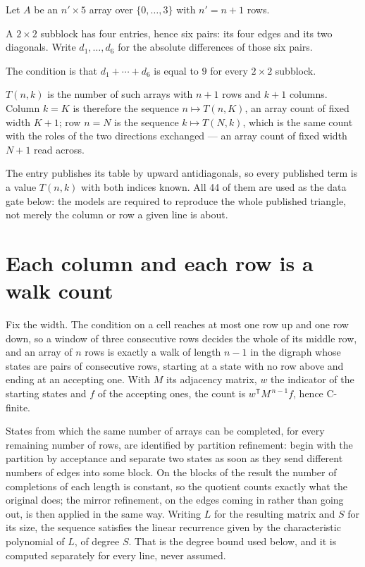\documentclass[11pt]{article}
\theoremstyle{definition}
\begin{document}
Let $A$ be an $n' \times 5$ array over $\{0,\dots,3\}$ with $n' = n + 1$ rows.

A $2\times2$ subblock has four entries, hence six pairs: its four edges and its two diagonals. Write $d_1,\dots,d_6$ for the absolute differences of those six pairs.

The condition is that $d_1+\cdots+d_6$ is equal to $9$ for every $2\times2$ subblock.

$T(n,k)$ is the number of such arrays with $n + 1$ rows and $k + 1$ columns. Column $k = K$ is therefore the sequence $n \mapsto T(n,K)$, an array count of fixed width $K + 1$; row $n = N$ is the sequence $k \mapsto T(N,k)$, which is the same count with the roles of the two directions exchanged --- an array count of fixed width $N + 1$ read across.

The entry publishes its table by upward antidiagonals, so every published term is a value $T(n,k)$ with both indices known. All 44 of them are used as the data gate below: the models are required to reproduce the whole published triangle, not merely the column or row a given line is about.

\section{Each column and each row is a walk count}

Fix the width. The condition on a cell reaches at most one row up and one row down, so a window of three consecutive rows decides the whole of its middle row, and an array of $n$ rows is exactly a walk of length $n-1$ in the digraph whose states are pairs of consecutive rows, starting at a state with no row above and ending at an accepting one. With $M$ its adjacency matrix, $w$ the indicator of the starting states and $f$ of the accepting ones, the count is $w^{\mathsf T}M^{\,n-1}f$, hence C-finite.

States from which the same number of arrays can be completed, for every remaining number of rows, are identified by partition refinement: begin with the partition by acceptance and separate two states as soon as they send different numbers of edges into some block. On the blocks of the result the number of completions of each length is constant, so the quotient counts exactly what the original does; the mirror refinement, on the edges coming in rather than going out, is then applied in the same way. Writing $L$ for the resulting matrix and $S$ for its size, the sequence satisfies the linear recurrence given by the characteristic polynomial of $L$, of degree $S$. That is the degree bound used below, and it is computed separately for every line, never assumed.
\end{document}
